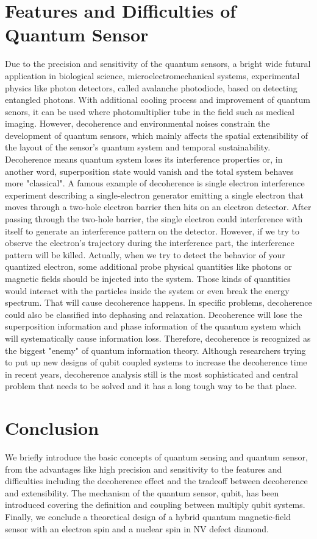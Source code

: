 \documentclass[11pt]{article}
\begin{document}
\section{Features and Difficulties of Quantum Sensor}
Due to the precision and sensitivity of the quantum sensors, a bright wide futural application in biological science, microelectromechanical systems, experimental physics like photon detectors, called avalanche photodiode, based on detecting entangled photons. With additional cooling process and improvement of quantum senors, it can be used where photomultiplier tube in the field such as medical imaging. However, decoherence and environmental noises constrain the development of quantum sensors, which mainly affects the spatial extensibility of the layout of the sensor's quantum system and temporal sustainability. Decoherence means quantum system loses its interference properties or, in another word, superposition state would vanish and the total system behaves more "classical". A famous example of decoherence is single electron interference experiment describing a single-electron generator emitting a single electron that moves through a two-hole electron barrier then hits on an electron detector. After passing through the two-hole barrier, the single electron could interference with itself to generate an interference pattern on the detector. However, if we try to observe the electron's trajectory during the interference part, the interference pattern will be killed. Actually, when we try to detect the behavior of your quantized electron, some additional probe physical quantities like photons or magnetic fields should be injected into the system. Those kinds of quantities would interact with the particles inside the system or even break the energy spectrum. That will cause decoherence happens. In specific problems, decoherence could also be classified into dephasing and relaxation. Decoherence will lose the superposition information and phase information of the quantum system which will systematically cause information loss. Therefore, decoherence is recognized as the biggest "enemy" of quantum information theory. Although researchers trying to put up new designs of qubit coupled systems to increase the decoherence time in recent years, decoherence analysis still is the most sophisticated and central problem that needs to be solved and it has a long tough way to be that place.

\section{Conclusion}
We briefly introduce the basic concepts of quantum sensing and quantum sensor, from the advantages like high precision and sensitivity to the features and difficulties including the decoherence effect and the tradeoff between decoherence and extensibility. The mechanism of the quantum sensor, qubit, has been introduced covering the definition and coupling between multiply qubit systems. Finally, we conclude a theoretical design of a hybrid quantum magnetic-field sensor with an electron spin and a nuclear spin in NV defect diamond.
\end{document}
